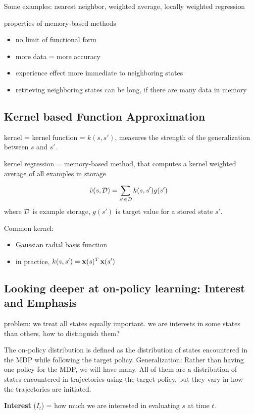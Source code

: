 \documentclass[sutton_barto_notes.tex]{subfiles}
\begin{document}
Some examples: nearest neighbor, weighted average, locally weighted regression

properties of memory-based methods
\begin{itemize}
\item no limit of functional form
\item more data = more accuracy
\item experience effect more immediate to neighboring states
\item retrieving neighboring states can be long, if there are many data in memory
\end{itemize}

\subsection{Kernel based Function Approximation}

kernel = kernel function = $k(s,s')$, measures the strength of the generalization between $s$ and $s'$.

kernel regression = memory-based method, that computes a kernel weighted average of all examples in storage

$$ \hat{v}(s, \operatorname*{\mathcal{D}}) = \sum_{s'\in \operatorname*{\mathcal{D}}} k(s,s') g (s') $$
where $\operatorname*{\mathcal{D}}$ is example storage, $g(s')$ is target value for a stored state $s'$.

Common kernel:
\begin{itemize}
\item Gaussian radial basis function
\item in practice, $k(s,s') = \operatorname*{\mathbf{x}}(s)^T \operatorname*{\mathbf{x}}(s')$
\end{itemize}

\subsection{Looking deeper at on-policy learning: Interest and Emphasis}

problem: we treat all states equally important. we are interests in some states than others, how to distinguish them?

The on-policy distribution is defined as the distribution of states encountered in the MDP while following the target policy. Generalization: Rather than having one policy for the MDP, we will have many. All of them are a distribution of states encountered in trajectories using the target policy, but they vary in how the trajectories are initiated.

\textbf{Interest} ($I_t$) = how much we are interested in evaluating $s$ at time $t$.
\end{document}
